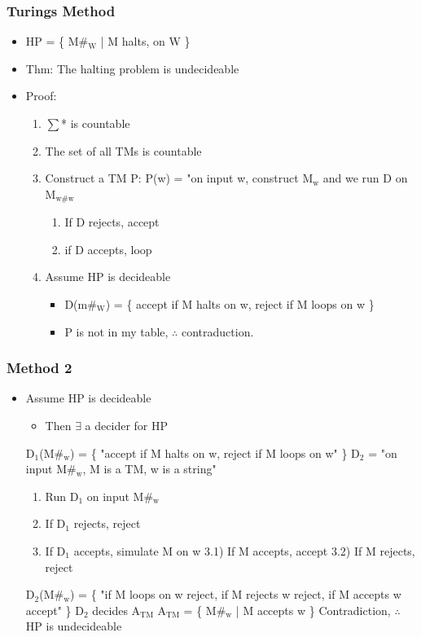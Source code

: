 \documentclass[11pt]{article}
\begin{document}
\subsubsection{Turings Method}
\label{sec:org0f2269c}
\begin{itemize}
\item HP = \{ M\#\(_{\text{W}}\) | M halts, on W \}
\item Thm: The halting problem is undecideable
\item Proof: 
\begin{enumerate}
\item \(\sum\)* is countable
\item The set of all TMs is countable
\item Construct a TM P:
P(w) = "on input w, construct M\(_{\text{w}}\) and we run D on M\(_{\text{w\#w}}\)
\begin{enumerate}
\item If D rejects, accept
\item if D accepts, loop
\end{enumerate}
\item Assume HP is decideable
\begin{itemize}
\item D(m\#\(_{\text{W}}\)) = \{ accept if M halts on w, reject if M loops on w \}
\item P is not in my table, \(\therefore\) contraduction.
\end{itemize}
\end{enumerate}
\end{itemize}
\subsubsection{Method 2}
\label{sec:orgbfbf4fa}
\begin{itemize}
\item Assume HP is decideable
\begin{itemize}
\item Then \(\exists\) a decider for HP
\end{itemize}
D\(_{\text{1}}\)(M\#\(_{\text{w}}\)) = \{ "accept if M halts on w, reject if M loops on w" \}
D\(_{\text{2}}\) = "on input M\#\(_{\text{w}}\), M is a TM, w is a string"
\begin{enumerate}
\item Run D\(_{\text{1}}\) on input M\#\(_{\text{w}}\)
\item If D\(_{\text{1}}\) rejects, reject
\item If D\(_{\text{1}}\) accepts, simulate M on w
3.1) If M accepts, accept
3.2) If M rejects, reject
\end{enumerate}
D\(_{\text{2}}\)(M\#\(_{\text{w}}\)) = \{ "if M loops on w reject, if M rejects w reject, if M accepts w accept" \}
D\(_{\text{2}}\) decides A\(_{\text{TM}}\)
A\(_{\text{TM}}\) = \{ M\#\(_{\text{w}}\) | M accepts w \}
Contradiction, \(\therefore\) HP is undecideable
\end{itemize}
\end{document}
